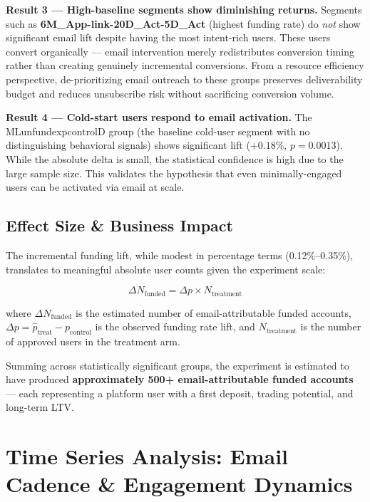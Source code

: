 \documentclass[12pt,a4paper]{article}
\newcommand{\colname}[1]{{\ttfamily\renewcommand{\_}{\textunderscore\allowbreak}#1}}
\begin{document}
\textbf{Result 3 — High-baseline segments show diminishing returns.}
Segments such as \textbf{6M\_App-link-20D\_Act-5D\_Act} (highest funding rate) do
\textit{not} show significant email lift despite having the most intent-rich users.
These users convert organically — email intervention merely redistributes conversion
timing rather than creating genuinely incremental conversions. From a resource
efficiency perspective, de-prioritizing email outreach to these groups preserves
deliverability budget and reduces unsubscribe risk without sacrificing conversion volume.

\textbf{Result 4 — Cold-start users respond to email activation.}
The \colname{ML\_unfund\_exp\_control\_D} group (the baseline cold-user segment with
no distinguishing behavioral signals) shows significant lift ($+0.18\%$, $p = 0.0013$).
While the absolute delta is small, the statistical confidence is high due to the
large sample size. This validates the hypothesis that even minimally-engaged users
can be activated via email at scale.

\subsection{Effect Size \& Business Impact}

The incremental funding lift, while modest in percentage terms (0.12\%--0.35\%),
translates to meaningful absolute user counts given the experiment scale:

\begin{equation}
  \Delta N_{\text{funded}} = \Delta p \times N_{\text{treatment}}
\end{equation}

\noindent where $\Delta N_{\text{funded}}$ is the estimated number of email-attributable
funded accounts, $\Delta p = \hat{p}_{\text{treat}} - p_{\text{control}}$ is the observed
funding rate lift, and $N_{\text{treatment}}$ is the number of approved users in the
treatment arm.

Summing across statistically significant groups, the experiment is estimated to have
produced \textbf{approximately 500+ email-attributable funded accounts} — each
representing a platform user with a first deposit, trading potential, and long-term LTV.

\clearpage
\section{Time Series Analysis: Email Cadence \& Engagement Dynamics}
\end{document}
